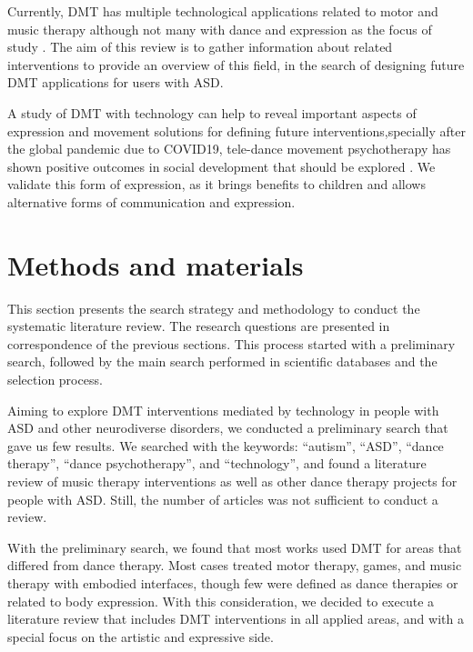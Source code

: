 \documentclass[a4paper,fleqn]{cas-sc}
\begin{document}
Currently, DMT has multiple technological applications related to motor and music therapy although not many with dance and expression as the focus of study \cite{Ragone21}. The aim of this review is to gather information about related interventions to provide an overview of this field, in the search of designing future DMT applications for users with ASD.

A study of DMT with technology can help to reveal important aspects of expression and movement solutions for defining future interventions,specially after the global pandemic due to COVID19, tele-dance movement psychotherapy has shown positive outcomes in social development that should be explored \cite{Moo23, Araya2024}. We validate this form of expression, as it brings benefits to children and allows alternative forms of communication and expression.


\section{Methods and materials} %
\label{sec3:methods}
This section presents the search strategy and methodology to conduct the systematic literature review. The research questions are presented in correspondence of the previous sections. This process started with a preliminary search, followed by the main search performed in scientific databases and the selection process.

Aiming to explore DMT interventions mediated by technology in people with ASD and other neurodiverse disorders, we conducted a preliminary search that gave us few results. We searched with the keywords: ``autism'', ``ASD'', ``dance therapy'', ``dance psychotherapy'', and ``technology'', and found a literature review of music therapy interventions as well as other dance therapy projects for people with ASD. Still, the number of articles was not sufficient to conduct a review. 

With the preliminary search, we found that most works used DMT for areas that differed from dance therapy. Most cases treated motor therapy, games, and music therapy with embodied interfaces, though few were defined as dance therapies or related to body expression. With this consideration, we decided to execute a literature review that includes DMT interventions in all applied areas, and with a special focus on the artistic and expressive side. 
\end{document}
